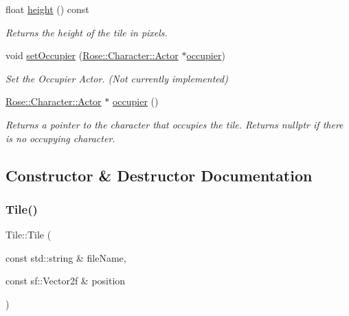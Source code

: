 \begin{DoxyCompactItemize}
float \mbox{\hyperlink{classRose_1_1Tile_a93878ba24748c81017215d97efd1a2f0}{height}} () const
\begin{DoxyCompactList}\small\item\em Returns the height of the tile in pixels. \end{DoxyCompactList}\item 
void \mbox{\hyperlink{classRose_1_1Tile_ab82cc04b5c43ad0838b993b90a14fff3}{set\+Occupier}} (\mbox{\hyperlink{classRose_1_1Character_1_1Actor}{Rose\+::\+Character\+::\+Actor}} $\ast$\mbox{\hyperlink{classRose_1_1Tile_acce49d5fa69fa6c8945f4b2efe79f718}{occupier}})
\begin{DoxyCompactList}\small\item\em Set the Occupier Actor. (Not currently implemented) \end{DoxyCompactList}\item 
\mbox{\hyperlink{classRose_1_1Character_1_1Actor}{Rose\+::\+Character\+::\+Actor}} $\ast$ \mbox{\hyperlink{classRose_1_1Tile_acce49d5fa69fa6c8945f4b2efe79f718}{occupier}} ()
\begin{DoxyCompactList}\small\item\em Returns a pointer to the character that occupies the tile. Returns nullptr if there is no occupying character. \end{DoxyCompactList}\end{DoxyCompactItemize}


\subsection{Constructor \& Destructor Documentation}
\mbox{\label{classRose_1_1Tile_aa56994a706f8b5f5468d7fa7c9820346}} 
\subsubsection{\texorpdfstring{Tile()}{Tile()}\hspace{0.1cm}{\footnotesize\ttfamily [1/3]}}
{\footnotesize\ttfamily Tile\+::\+Tile (\begin{DoxyParamCaption}\item[{const std\+::string \&}]{file\+Name,  }\item[{const sf\+::\+Vector2f \&}]{position }\end{DoxyParamCaption})\hspace{0.3cm}{\ttfamily [explicit]}}



